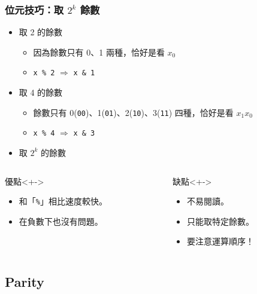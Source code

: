 \documentclass[utf8]{beamer}
\begin{document}
\begin{CJK}{UTF8}{bkai}
\begin{frame}[fragile]
  \frametitle{位元技巧：取 $2^k$ 餘數}
  \begin{itemize}[<+->]
  \item 取 2 的餘數
    \begin{itemize}
    \item 因為餘數只有 0、1 兩種，恰好是看 $x_0$
    \item \lstinline{x % 2}{} $\Rightarrow$ \lstinline{x & 1}{}
    \end{itemize}
  \item 取 4 的餘數
    \begin{itemize}
    \item 餘數只有 0(\lstinline{00}{})、1(\lstinline{01}{})、2(\lstinline{10}{})、3(\lstinline{11}{}) 四種，恰好是看 $x_1x_0$
    \item \lstinline{x % 4}{} $\Rightarrow$ \lstinline{x & 3}{} 
    \end{itemize}
  \item 取 $2^k$ 的餘數 
  \end{itemize}
  \begin{columns}[T]
    \begin{column}[T]{5.5cm}
    \begin{exampleblock}{優點}<+->
      \begin{itemize}
      \item 和「\lstinline{%}{}」相比速度較快。
      \item<+-> 在負數下也沒有問題。
      \end{itemize}
    \end{exampleblock}
    \end{column}
    \begin{column}[T]{5.5cm}
    \begin{alertblock}{缺點}<+->
      \begin{itemize}
      \item 不易閱讀。
      \item<+-> 只能取特定餘數。
      \item<+-> 要注意\alert{運算順序}！
      \end{itemize}
    \end{alertblock}
    \end{column}
  \end{columns}
\end{frame}

\subsection{Parity}


\end{CJK}
\end{document}
